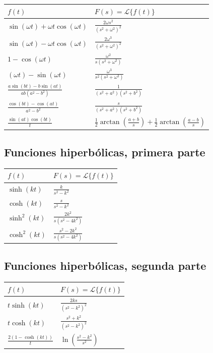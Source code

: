\begin{center}
	\renewcommand{\arraystretch}{1.8}
	\begin{tabular}{ll}
		\textbf{$f(t)$} & \textbf{$F(s) = \mathcal{L}\{f(t)\}$} \\ \hline
		$\sin(\omega t) + \omega t\cos(\omega t)$ & $\frac{2\omega s^{2}}{(s^{2}+\omega ^{2})^{2}}$ \\ 
		$\sin(\omega t) - \omega t\cos(\omega t)$ & $\frac{2\omega ^{3}}{(s^{2}+\omega ^{2})^{2}}$ \\ 
		$1-\cos(\omega t)$ & $\frac{\omega ^{2}}{s(s^{2}+\omega^{2})}$ \\ 
		$(\omega t) - \sin(\omega t)$ & $\frac{\omega ^{3}}{s^{2}(s^{2}+\omega ^{2})}$ \\ 
		$\frac{a\sin(bt) - b\sin(at)}{ab(a^{2}-b^{2})}$ & $\frac{1}{(s^{2}+a^{2})(s^{2}+b^{2})}$ \\ 
		$\frac{\cos(bt) - \cos(at)}{a^{2}-b^{2}}$ & $\frac{s}{(s^{2}+a^{2})(s^{2}+b^{2})}$ \\ 
		$\frac{\sin(at)\cos(bt)}{t}$ & $\frac{1}{2}\arctan \left(\frac{a+b}{s}\right) + \frac{1}{2}\arctan \left(\frac{a-b}{s}\right)$ \\ 
	\end{tabular}
\end{center}

\subsection{Funciones hiperb\'{o}licas, primera parte}

\begin{center}
	\renewcommand{\arraystretch}{1.8}
	\begin{tabular}{ll}
		\textbf{$f(t)$} & \textbf{$F(s) = \mathcal{L}\{f(t)\}$} \\ \hline
		$\sinh(kt)$ & $\frac{k}{s^{2}-k^{2}}$ \\ 
		$\cosh(kt)$ & $\frac{s}{s^{2}-k^{2}}$ \\ 
		$\sinh^{2}(kt)$ & $\frac{2k^{2}}{s(s^{2}-4k^{2})}$ \\ 
		$\cosh^{2}(kt)$ & $\frac{s^{2}-2k^{2}}{s(s^{2}-4k^{2})}$
	\end{tabular}
\end{center}

\subsection{Funciones hiperb\'{o}licas, segunda parte}

\begin{center}
	\renewcommand{\arraystretch}{1.8}
	\begin{tabular}{ll}
		\textbf{$f(t)$} & \textbf{$F(s) = \mathcal{L}\{f(t)\}$} \\ \hline
		$t\sinh(kt)$ & $\frac{2ks}{(s^{2}-k^{2})^{2}}$ \\ 
		$t\cosh(kt)$ & $\frac{s^{2}+k^{2}}{(s^{2}-k^{2})^{2}}$ \\ 
		$\frac{2(1-\cosh(kt))}{t}$ & $\ln \left( \frac{s^{2}-k^{2}}{s^{2}} \right)$ \\ 
	\end{tabular}
\end{center}

